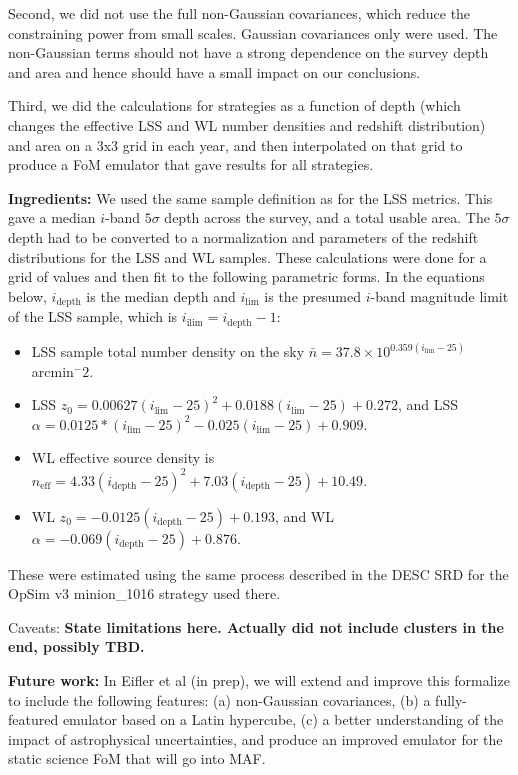 \documentclass[a4paper,10pt]{article}
\begin{document}
Second, we did not use the full non-Gaussian covariances, which reduce the constraining power from
small scales.  Gaussian covariances only were used.  The non-Gaussian terms should not have a strong
dependence on the survey depth and area and hence should have a small impact on our conclusions.

Third, we did the calculations for strategies as a function of depth (which changes the effective
LSS and WL number densities and redshift distribution) and area on a 3x3 grid in each year, and then
interpolated on that grid to produce a FoM emulator that gave results for all strategies.

\textbf{Ingredients:} We used the same sample definition as for the LSS metrics.  This gave a median
$i$-band $5\sigma$ depth across the survey, and a  total usable area.  The $5\sigma$ depth had to be
converted to a normalization and parameters of the redshift distributions for the LSS and WL
samples.  These calculations were done for a grid of values and then fit to the following parametric
forms.  In the equations below, $i_\text{depth}$ is the median depth and $i_\text{lim}$ is the
presumed $i$-band magnitude limit of the LSS sample, which is $i_\text{ilim} = i_\text{depth}-1$:
\begin{itemize}
\item LSS sample total number density on the sky $\bar{n}=37.8 \times 10^{0.359 (i_\text{lim} -
25)}$ arcmin$^-2$.
\item LSS $z_0 = 0.00627 (i_\text{lim}-25)^2 + 0.0188 (i_\text{lim}-25) + 0.272$, and LSS $\alpha =
0.0125*(i_\text{lim}-25)^2 - 0.025 (i_\text{lim}-25) + 0.909$.
\item WL effective source density is $n_\text{eff} = 4.33 (i_\text{depth}-25)^2 + 7.03 (i_\text{depth}-25) + 10.49$.
\item WL $z_0 = -0.0125 (i_\text{depth}-25) + 0.193$, and WL $\alpha = -0.069 (i_\text{depth}-25) +
0.876$.
\end{itemize}

These were estimated using the same process described in the DESC SRD for the OpSim v3 minion\_1016
strategy used there.

Caveats: \textbf{State limitations here.  Actually did not include clusters in the end, possibly TBD.}

\textbf{Future work:} In Eifler et al (in prep), we will extend and improve this formalize to
include the following features: (a) non-Gaussian covariances, (b) a fully-featured emulator based on
a Latin hypercube, (c) a better understanding of the impact of astrophysical uncertainties, and
produce an improved emulator for the static science FoM that will go into MAF.
\end{document}
